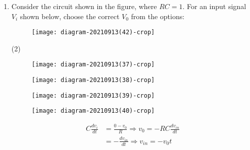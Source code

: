 \begin{enumerate}
{	}
\begin{tasks}(4)
\task[\textbf{A.}] $0.71$ and $45^{\circ}$
\task[\textbf{B.}]  $0.71$ and $-45^{\circ}$
\task[\textbf{C.}] $0.5$ and $-90^{\circ}$
\task[\textbf{D.}] $0.5$ and $90^{\circ}$
\end{tasks}
\begin{answer}
\begin{align*}
\frac{v_{0}}{v_{i n}}&=\frac{X_{C}}{R+X_{C}}=\frac{1}{\frac{R}{X_{C}}+1}\\&=\frac{1}{1+j \omega C R}\\
At \omega&=\omega_{C}=\frac{1}{R C} \Rightarrow \frac{v_{0}}{v_{i n}}=\frac{1}{1+j}\\&=\frac{1}{\sqrt{2} e^{j 45^{0}}}=\frac{1}{\sqrt{2}} e^{-j 45^{0}}
\end{align*}
So the correct answer is \textbf{Option (B)}
\end{answer}
	\item Consider the circuit shown in the figure, where $R C=1$. For an input signal $V_{i}$ shown below, choose the correct $V_{0}$ from the options:
{	}
\begin{figure}[H]
\centering
\texttt{[image: diagram-20210913(42)-crop]}
\end{figure}
\begin{tasks}(2)
\task[\textbf{A.}] \begin{figure}[H]
	\centering
	\texttt{[image: diagram-20210913(37)-crop]}
\end{figure}
\task[\textbf{B.}] \begin{figure}[H]
	\centering
	\texttt{[image: diagram-20210913(38)-crop]}
\end{figure}
\task[\textbf{C.}] \begin{figure}[H]
	\centering
	\texttt{[image: diagram-20210913(39)-crop]}
\end{figure}
\task[\textbf{D.}]\begin{figure}[H]
	\centering
	\texttt{[image: diagram-20210913(40)-crop]}
\end{figure}
\end{tasks}
\begin{answer}
\begin{align*}
C \frac{d v_{i}}{d t}&=\frac{0-v_{0}}{R} \Rightarrow v_{0}=-R C \frac{d v_{i n}}{d t}\\&=-\frac{d v_{i n}}{d t} \Rightarrow v_{i n}=-v_{0} t\\

\end{align*}
\end{answer}
\end{enumerate}

